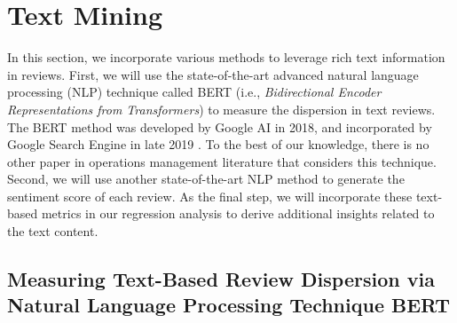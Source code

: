 \documentclass[msom,blindrev]{informs3}
\begin{document}
	
	\section{Text Mining}\label{Sec: TextMining}
	
	In this section, we incorporate various methods to leverage rich text information in reviews.  First, we will use the state-of-the-art advanced natural language processing (NLP) technique called BERT (i.e., \textit{Bidirectional Encoder Representations from Transformers}) to measure the dispersion in text reviews. The BERT method was developed by Google AI in 2018, and incorporated by  Google Search Engine in late 2019 \citep{devlin2018bert,BERT}. To the best of our knowledge, there is no other paper in operations management literature that considers this technique. Second, we will use another state-of-the-art NLP method to generate the sentiment score of each review. As the final step, we will incorporate these text-based metrics in our regression analysis to derive additional insights related to the text content.
	
	\subsection{Measuring Text-Based Review Dispersion via Natural Language Processing Technique BERT} \label{Subsec: Define Txt Ent}
	
\end{document}
